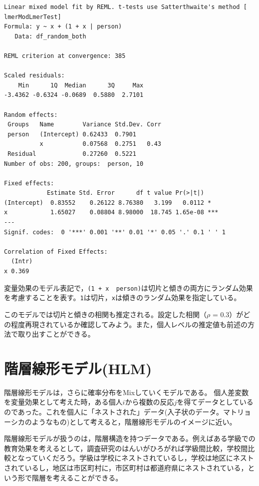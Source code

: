 \documentclass[
  a4paper,
]{ltjsbook}
\begin{document}
\begin{verbatim}
Linear mixed model fit by REML. t-tests use Satterthwaite's method [
lmerModLmerTest]
Formula: y ~ x + (1 + x | person)
   Data: df_random_both

REML criterion at convergence: 385

Scaled residuals: 
    Min      1Q  Median      3Q     Max 
-3.4362 -0.6324 -0.0689  0.5880  2.7101 

Random effects:
 Groups   Name        Variance Std.Dev. Corr
 person   (Intercept) 0.62433  0.7901       
          x           0.07568  0.2751   0.43
 Residual             0.27260  0.5221       
Number of obs: 200, groups:  person, 10

Fixed effects:
            Estimate Std. Error      df t value Pr(>|t|)    
(Intercept)  0.83552    0.26122 8.76380   3.199   0.0112 *  
x            1.65027    0.08804 8.98000  18.745 1.65e-08 ***
---
Signif. codes:  0 '***' 0.001 '**' 0.01 '*' 0.05 '.' 0.1 ' ' 1

Correlation of Fixed Effects:
  (Intr)
x 0.369 
\end{verbatim}

変量効果のモデル表記で，\texttt{(1\ +\ x\ \textbar{}\ person)}は切片と傾きの両方にランダム効果を考慮することを表す。\texttt{1}は切片，\texttt{x}は傾きのランダム効果を指定している。

このモデルでは切片と傾きの相関も推定される。設定した相関（\(\rho\) =
0.3）がどの程度再現されているか確認してみよう。また，個人レベルの推定値も前述の方法で取り出すことができる。

\section{階層線形モデル(HLM)}\label{ux968eux5c64ux7ddaux5f62ux30e2ux30c7ux30ebhlm}

階層線形モデルは，さらに確率分布をMixしていくモデルである。
個人差変数を変量効果として考えた時，ある個人\(i\)から複数の反応\(j\)を得てデータとしているのであった。これを個人に「ネストされた」データ(入子状のデータ。マトリョーシカのようなもの)として考えると，階層線形モデルのイメージに近い。

階層線形モデルが扱うのは，階層構造を持つデータである。例えばある学級での教育効果を考えるとして，調査研究のはんいがひろがれば学級間比較，学校間比較となっていくだろう。学級は学校にネストされているし，学校は地区にネストされているし，地区は市区町村に，市区町村は都道府県にネストされている，という形で階層を考えることができる。
\end{document}
